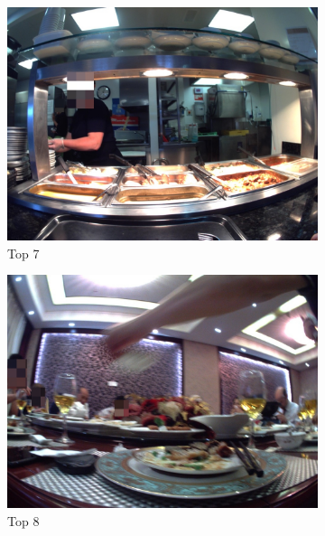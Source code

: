 \begin{figure}[H]
  \begin{subfigure}{0.32\textwidth}
    \includegraphics[width=\textwidth]{Sections/7Results/images/top7.jpg} 
    \caption{Top 7}
  \end{subfigure}
  \begin{subfigure}{0.32\textwidth}
    \includegraphics[width=\textwidth]{Sections/7Results/images/top8.jpg}\hfill
    \caption{Top 8}
  \end{subfigure}
  \begin{subfigure}{0.32\textwidth}

\end{subfigure}
\end{figure}
